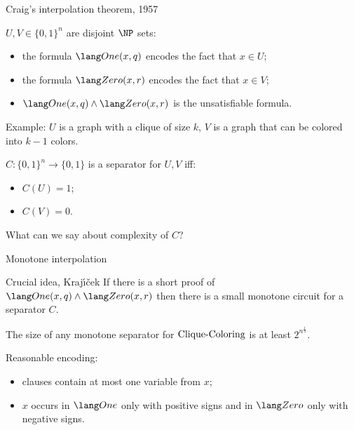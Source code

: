 \begin{frame}{Craig's interpolation theorem, 1957}

    $U, V \in \{0, 1\}^n$ are disjoint $\NP$ sets:
    \begin{itemize}
        \item the formula $\One(x, q)$ encodes the fact that $x \in U$;
        \item the formula $\Zero(x, r)$ encodes the fact that $x \in V$;
        \item $\One(x, q) \land \Zero(x, r)$ is the unsatisfiable formula.
            
    \end{itemize}

    \vspace{0.2cm}
    \pause
    Example: $U$ is a graph with a clique of size $k$, $V$ is a graph that can be colored into $k - 1$
    colors.

    \pause
    \begin{definition}
	    $C: \{0, 1\}^n \to \{0, 1\}$ is a separator for $U, V$ iff:
        \begin{itemize}
            \item $C(U) = 1$;
            \item $C(V) = 0$.
        \end{itemize}        
    \end{definition}

    \pause
	What can we say about complexity of $C$?

\end{frame}


\begin{frame}{Monotone interpolation}

    \begin{block}{Crucial idea, Kraj{\'{\i}}{\v{c}}ek}
        If there is a short proof of $\One(x, q) \land \Zero(x, r)$ then there is a small
        \alert{monotone} {\color{blue} circuit} for a separator $C$.
    \end{block}

    \begin{theorem}
        The size of any monotone separator for $\mathrm{Clique}\text{-}\mathrm{Coloring}$ is at least $2^{n^{\frac{1}{4}}}$.
    \end{theorem}

    \pause
    Reasonable encoding:
    \begin{itemize}
        \item clauses contain at most one variable from $x$;
        \item $x$ occurs in $\One$ only with positive signs and in $\Zero$ only with negative signs.
    \end{itemize}
\end{frame}

